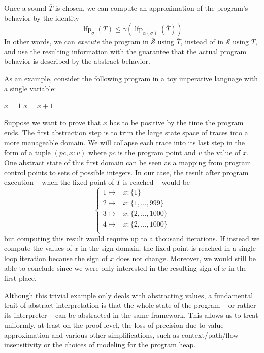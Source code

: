 \documentclass[11pt]{article}
\renewcommand{\S}{\mathcal{S}}
\newcommand{\oS}{\overline{\mathcal{S}}}
\DeclareMathOperator{\lfp}{lfp}
\begin{document}
Once a sound $\overline{T}$ is chosen, we can compute an approximation of the program's behavior by the identity
\[ \lfp_\sigma(T) \leq \gamma(\lfp_{\alpha(\sigma)}(\overline{T})) \]
In other words, we can \emph{execute} the program in $\oS$ using $\overline{T}$, instead of in $\S$ using $T$, and use the resulting information with the guarantee that the actual program behavior is described by the abstract behavior.

As an example, consider the following program in a toy imperative language with a single variable:

\begin{algorithmic}[1]
\State $x = 1$
\State $x = x+1$
\EndWhile
\end{algorithmic}


Suppose we want to prove that $x$ has to be positive by the time the program ends. The first abstraction step is to trim the large state space of traces into a more manageable domain. We will collapse each trace into its last step in the form of a tuple $\left(pc,x:v\right)$ where $pc$ is the program point and $v$ the value of $x$. One abstract state of this first domain can be seen as a mapping from program control points to sets of possible integers. In our case, the result after program execution -- when the fixed point of $\overline{T}$ is reached -- would be
\[
\begin{cases}
1 \mapsto & x:\{1\} \\
2 \mapsto & x:\{1, \dots, 999\} \\
3 \mapsto & x:\{2, \dots, 1000\} \\
4 \mapsto & x:\{2, \dots, 1000\} \\
\end{cases}
\]
but computing this result would require up to a thousand iterations. If instead we compute the values of $x$ in the sign domain, the fixed point is reached in a single loop iteration because the sign of $x$ does not change. Moreover, we would still be able to conclude since we were only interested in the resulting sign of $x$ in the first place.

Although this trivial example only deals with abstracting values, a fundamental trait of abstract interpretation is that the whole state of the program -- or rather its interpreter -- can be abstracted in the same framework. This allows us to treat uniformly, at least on the proof level, the loss of precision due to value approximation and various other simplifications, such as context/path/flow-insensitivity or the choices of modeling for the program heap.
\end{document}
